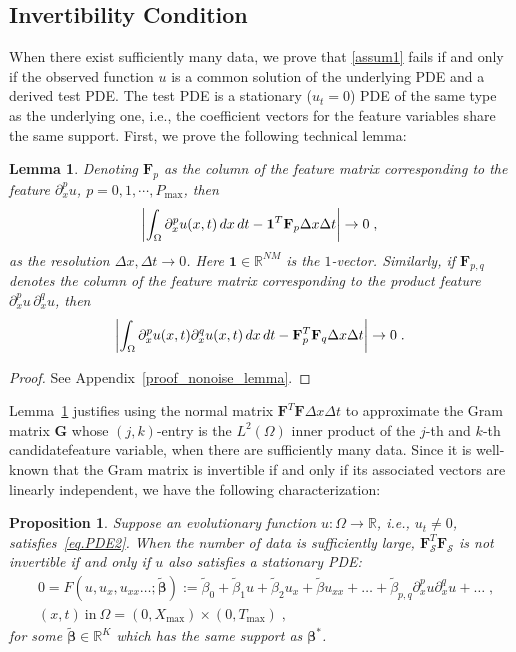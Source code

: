 \documentclass[a4paper,11pt]{article}
\newcommand{\bbeta}{\bm{\beta}}
\newcommand{\bF}{\mathbf{F}}
\newcommand{\mS}{\mathcal{S}}
\newtheorem{lemma}{Lemma}[section]
\newtheorem{prop}{Proposition}[section]
\begin{document}
\subsection{Invertibility Condition}\label{sec.invertibility}
When there exist sufficiently many data, we prove that \eqref{assum1} fails if and only if the observed function $u$ is a common solution of the underlying PDE and a derived test PDE. The  test PDE is a stationary ($u_t=0$) PDE of the same type as the underlying one, i.e., the coefficient vectors for the feature variables share the same support. First, we prove the following technical lemma:
\begin{lemma}\label{nonoise_lemma}
Denoting $\bF_p$ as the column of the feature matrix corresponding to the feature $\partial_x^p u$, $p=0,1,\cdots,P_{\max}$, then
\begin{align}
	\abs{\int_\Omega \partial_x^pu(x,t)\,dx\,dt-\mathbf{1}^T\bF_p\Delta x\Delta t}\to 0\;,
\end{align}
as the resolution $\Delta x,\Delta t\to 0$. Here $\mathbf{1}\in\mathbb{R}^{NM}$ is the $1$-vector. Similarly, if $\bF_{p,q}$ denotes the column of the feature matrix corresponding to the product feature $\partial_x^pu\,\partial_x^qu$, then
\begin{align}
	\abs{\int_\Omega\partial_x^pu(x,t)\partial_x^qu(x,t)\,dx\,dt-\bF_{p}^T\bF_{q}\Delta x\Delta t}\to 0\;.
\end{align}
\end{lemma}
\begin{proof}
See Appendix~\ref{proof_nonoise_lemma}.	
\end{proof}

Lemma~\ref{nonoise_lemma} justifies using the normal matrix $\bF^T\bF\Delta x\Delta t$ to approximate the Gram matrix $\mathbf{G}$ whose $(j,k)$-entry is the $L^2(\Omega)$ inner product of the $j$-th and $k$-th  candidatefeature variable, when there are sufficiently many data. Since it is well-known that the Gram matrix is invertible if and only if its associated vectors are linearly independent, we have the following characterization:  
\begin{prop}\label{prop.invert}Suppose an evolutionary function $u:\Omega\to\mathbb{R}$, i.e., $u_t\neq 0$, satisfies~\eqref{eq.PDE2}. When the number of data is sufficiently large,  $\bF_\mS^T\bF_\mS$ is not invertible if and only if $u$  also satisfies a stationary PDE:
\begin{align}
&0= F(u,u_x,u_{xx}\dots;\widetilde{\bbeta}):=\widetilde{\beta}_0+\widetilde{\beta}_1u+\widetilde{\beta}_2u_x+\widetilde{\beta}u_{xx}+\dots+\widetilde{\beta}_{p,q}\partial^p_xu\partial^q_xu+\dots	\;,\nonumber\\
&(x,t)~\text{in}~\Omega = (0,X_{\max})\times(0,T_{\max})\;,\label{eq.PDEtest}
\end{align}
for some  $\widetilde{\bbeta}\in\mathbb{R}^{K}$ which has the same support as $\bbeta^*$.
\end{prop}
\end{document}
